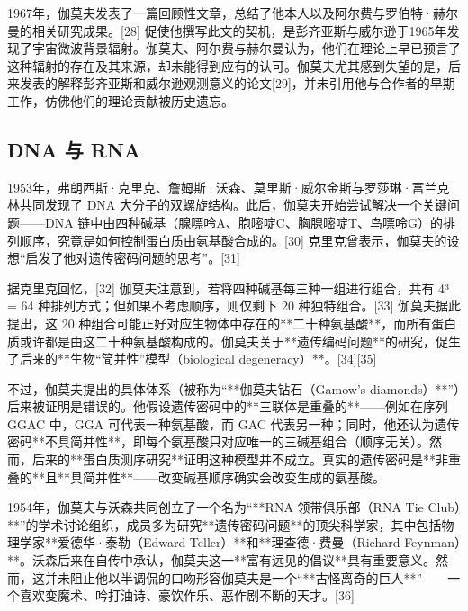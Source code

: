 1967年，伽莫夫发表了一篇回顾性文章，总结了他本人以及阿尔费与罗伯特·赫尔曼的相关研究成果。[28] 促使他撰写此文的契机，是彭齐亚斯与威尔逊于1965年发现了宇宙微波背景辐射。伽莫夫、阿尔费与赫尔曼认为，他们在理论上早已预言了这种辐射的存在及其来源，却未能得到应有的认可。伽莫夫尤其感到失望的是，后来发表的解释彭齐亚斯和威尔逊观测意义的论文[29]，并未引用他与合作者的早期工作，仿佛他们的理论贡献被历史遗忘。
\subsection{DNA 与 RNA}
1953年，弗朗西斯·克里克、詹姆斯·沃森、莫里斯·威尔金斯与罗莎琳·富兰克林共同发现了 DNA 大分子的双螺旋结构。此后，伽莫夫开始尝试解决一个关键问题——DNA 链中由四种碱基（腺嘌呤A、胞嘧啶C、胸腺嘧啶T、鸟嘌呤G）的排列顺序，究竟是如何控制蛋白质由氨基酸合成的。[30] 克里克曾表示，伽莫夫的设想“启发了他对遗传密码问题的思考”。[31]

据克里克回忆，[32] 伽莫夫注意到，若将四种碱基每三种一组进行组合，共有 4³ = 64 种排列方式；但如果不考虑顺序，则仅剩下 20 种独特组合。[33] 伽莫夫据此提出，这 20 种组合可能正好对应生物体中存在的**二十种氨基酸**，而所有蛋白质或许都是由这二十种氨基酸构成的。伽莫夫关于**遗传编码问题**的研究，促生了后来的**生物“简并性”模型（biological degeneracy）**。[34][35]

不过，伽莫夫提出的具体体系（被称为“**伽莫夫钻石（Gamow’s diamonds）**”）后来被证明是错误的。他假设遗传密码中的**三联体是重叠的**——例如在序列 GGAC 中，GGA 可代表一种氨基酸，而 GAC 代表另一种；同时，他还认为遗传密码**不具简并性**，即每个氨基酸只对应唯一的三碱基组合（顺序无关）。然而，后来的**蛋白质测序研究**证明这种模型并不成立。真实的遗传密码是**非重叠的**且**具简并性**——改变碱基顺序确实会改变生成的氨基酸。

1954年，伽莫夫与沃森共同创立了一个名为“**RNA 领带俱乐部（RNA Tie Club）**”的学术讨论组织，成员多为研究**遗传密码问题**的顶尖科学家，其中包括物理学家**爱德华·泰勒（Edward Teller）**和**理查德·费曼（Richard Feynman）**。沃森后来在自传中承认，伽莫夫这一**富有远见的倡议**具有重要意义。然而，这并未阻止他以半调侃的口吻形容伽莫夫是一个“**古怪离奇的巨人**”——一个喜欢变魔术、吟打油诗、豪饮作乐、恶作剧不断的天才。[36]
